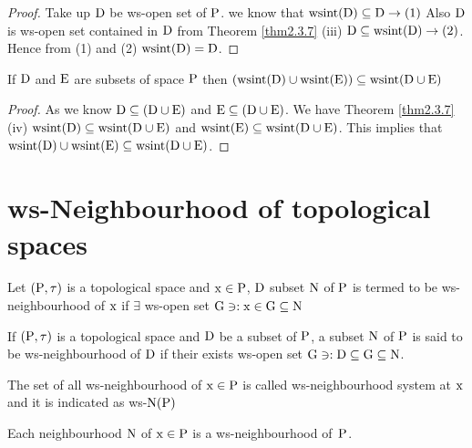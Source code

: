 \begin{proof}
Take up $\mathrm{D}$ be ws-open set of $\mathrm{P}$. we know that $\mathrm{wsint}(\mathrm{D})\subseteq \mathrm{D} \to (1)$ Also $\mathrm{D}$ is ws-open set contained in $\mathrm{D}$ from Theorem \ref{thm2.3.7} (iii) $\mathrm{D}\subseteq \mathrm{wsint}(\mathrm{D})\to (2)$. Hence from (1) and (2) $\mathrm{wsint}(\mathrm{D})=\mathrm{D}$.
\end{proof}

\begin{thm}\label{thm2.4.6}
If $\mathrm{D}$ and $\mathrm{E}$ are subsets of space $\mathrm{P}$ then $(\mathrm{wsint}(\mathrm{D})\cup \mathrm{wsint}(\mathrm{E}))\subseteq \mathrm{wsint}(\mathrm{D}\cup \mathrm{E})$
\end{thm}

\begin{proof}
As we know $\mathrm{D}\subseteq (\mathrm{D}\cup \mathrm{E})$ and $\mathrm{E}\subseteq (\mathrm{D}\cup \mathrm{E})$. We have Theorem \ref{thm2.3.7} (iv) $\mathrm{wsint}(\mathrm{D})\subseteq \mathrm{wsint}(\mathrm{D}\cup \mathrm{E})$ and $\mathrm{wsint}(\mathrm{E})\subseteq \mathrm{wsint}(\mathrm{D}\cup \mathrm{E})$. This implies that $\mathrm{wsint}(\mathrm{D})\cup \mathrm{wsint}(\mathrm{E})\subseteq \mathrm{wsint}(\mathrm{D}\cup \mathrm{E})$.
\end{proof}


\section{ws-Neighbourhood of topological spaces}\label{sec2.5}

\begin{dfn}\label{defi2.5.1}
Let $(\mathrm{P}, \tau)$ is a topological space and $\mathrm{x}\in \mathrm{P}$, $\mathrm{D}$ subset $\mathrm{N}$ of $\mathrm{P}$ is termed to be ws-neighbourhood of $\mathrm{x}$ if $\exists$ ws-open set $\mathrm{G} \ni: \mathrm{x}\in \mathrm{G}\subseteq \mathrm{N}$
\end{dfn}

\begin{dfn}\label{defi2.5.2}
If $(\mathrm{P}, \tau)$ is a topological space and $\mathrm{D}$ be a subset of $\mathrm{P}$, a subset $\mathrm{N}$ of $\mathrm{P}$ is said to be ws-neighbourhood of $\mathrm{D}$ if their exists ws-open set $\mathrm{G} \ni: \mathrm{D}\subseteq \mathrm{G}\subseteq \mathrm{N}$.
\end{dfn}

\begin{dfn}\label{defi2.5.3}
The set of all ws-neighbourhood of $\mathrm{x}\in \mathrm{P}$ is called ws-neighbourhood system at $\mathrm{x}$ and it is indicated as ws-$\mathrm{N}(\mathrm{P})$
\end{dfn}

\begin{thm}\label{thm2.5.4}
Each neighbourhood $\mathrm{N}$ of $\mathrm{x}\in \mathrm{P}$ is a ws-neighbourhood of~$\mathrm{P}$.
\end{thm}


